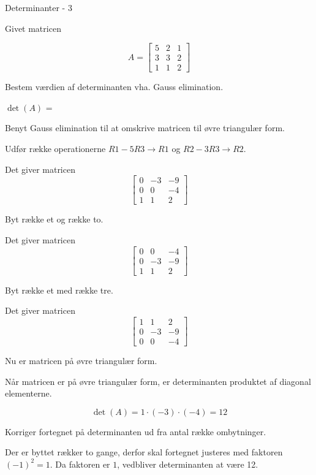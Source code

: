 \documentclass{article}
\begin{document}
\begin{exercise}{Determinanter - 3}

Givet matricen

\[
A = \left[\begin{array}{rrr}
5 & 2 & 1 \\ 
3 & 3 & 2 \\
1 & 1 & 2
\end{array} \right]
\]

Bestem værdien af determinanten vha. Gauss elimination.

$\det(A)$ = 

\hint
Benyt Gauss elimination til at omskrive matricen til 
øvre triangulær form.

\hint
Udfør række operationerne
$R1 - 5 R3 \to R1$ og 
$R2 - 3 R3 \to R2$.

\hint
Det giver matricen
\[
\left[\begin{array}{rrr}
0 & -3 & -9 \\ 
0 & 0 & -4 \\
1 & 1 & 2
\end{array} \right]
\]

\hint
Byt række et og række to.

\hint
Det giver matricen
\[
\left[\begin{array}{rrr}
0 & 0 & -4 \\
0 & -3 & -9 \\ 
1 & 1 & 2
\end{array} \right]
\]

\hint 
Byt række et med række tre.

\hint
Det giver matricen
\[
\left[\begin{array}{rrr}
1 & 1 & 2 \\
0 & -3 & -9 \\ 
0 & 0 & -4
\end{array} \right]
\]

\hint
Nu er matricen på øvre triangulær form.

\hint
Når matricen er på øvre triangulær form, er determinanten 
produktet af diagonal elementerne.

\hint
\[
\det(A) = 1 \cdot (-3) \cdot (-4) = 12
\]

\hint
Korriger fortegnet på determinanten ud fra antal række ombytninger.

\hint
Der er byttet rækker to gange, derfor skal fortegnet justeres med
faktoren $(-1)^2 = 1$.
Da faktoren er $1$, vedbliver determinanten at være 12.

\end{exercise}
\end{document}

